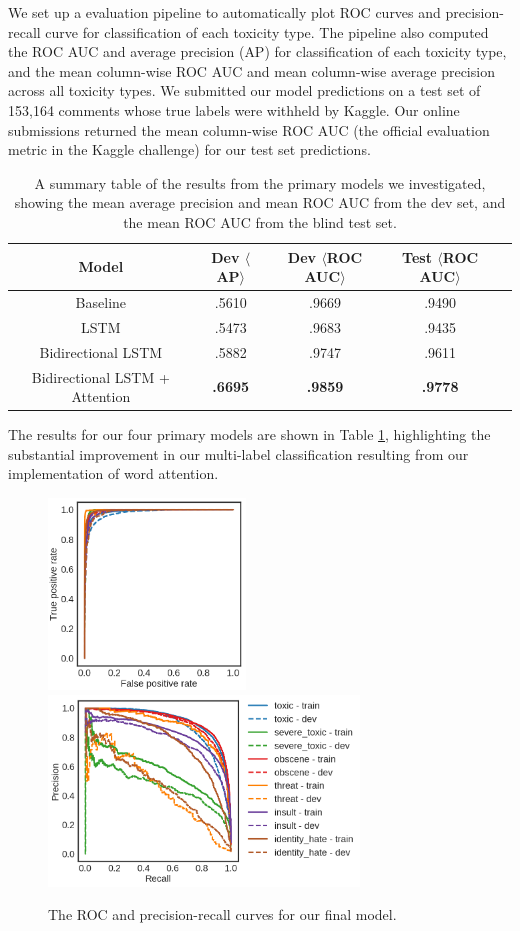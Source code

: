 \documentclass{article} %
\begin{document}
We set up a evaluation pipeline to automatically plot ROC curves and precision-recall curve for classification of each toxicity type. The pipeline also computed the ROC AUC and average precision (AP) for classification of each toxicity type, and the mean column-wise ROC AUC and mean column-wise average precision across all toxicity types. We submitted our model predictions on a test set of 153,164 comments whose true labels were withheld by Kaggle. Our online submissions returned the mean column-wise ROC AUC (the official evaluation metric in the Kaggle challenge) for our test set predictions.

\begin{table}[!ht]
\centering
\begin{tabular}{|c|c|c|c|c|}
\hline
Model & Dev $\langle$AP$\rangle$ & Dev $\langle$ROC AUC$\rangle$ & Test $\langle$ROC AUC$\rangle$ \\ \hline
Baseline & .5610 & .9669 & .9490 \\
LSTM & .5473 & .9683 & .9435 \\ 
Bidirectional LSTM & .5882 & .9747 & .9611 \\
Bidirectional LSTM + Attention & \textbf{.6695} & \textbf{.9859} & \textbf{.9778} \\
\hline
\end{tabular}
\caption{A summary table of the results from the primary models we investigated, showing the mean average precision and mean ROC AUC from the dev set, and the mean ROC AUC from the blind test set.}
\label{tab:results}
\end{table}

The results for our four primary models are shown in Table \ref{tab:results}, highlighting the substantial improvement in our multi-label classification resulting from our implementation of word attention.

\begin{figure}[ht]
\includegraphics[height=2in]{final_test_1_big_roc.png}
\includegraphics[height=2in]{final_test_1_big_prc.png}
\caption{The ROC and precision-recall curves for our final model.}
\label{fig:roc_final}
\end{figure}
\end{document}

